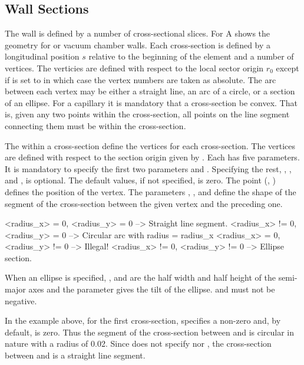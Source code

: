 \subsection{Wall Sections}
\label{s:wall.section}

The wall is defined by a number of cross-sectional slices. For A shows the
geometry for  or vacuum chamber walls.  Each cross-section is defined by a
longitudinal position $s$ relative to the beginning of the element and a number of vertices. The
verticies are defined with respect to the local sector origin $r_0$ except if 
is set to  in which case the vertex numbers are taken as absolute. The arc between each
vertex may be either a straight line, an arc of a circle, or a section of an ellipse. For a
capillary it is mandatory that a cross-section be convex. That is, given any two points within the
cross-section, all points on the line segment connecting them must be within the cross-section.

The  within a cross-section define the vertices for each cross-section. The vertices are
defined with respect to the section origin given by . Each  has five
parameters. It is mandatory to specify the first two parameters  and . Specifying
the rest, , , and , is optional. The default values, if not
specified, is zero. The point (, ) defines the position of the vertex. The
parameters , , and  define the shape of the segment of the
cross-section between the given vertex and the preceding one.
\begin{example}
  <radius_x>  = 0, <radius_y>  = 0   --> Straight line segment.
  <radius_x> != 0, <radius_y>  = 0   --> Circular arc with radius = radius_x
  <radius_x>  = 0, <radius_y> != 0   --> Illegal!
  <radius_x> != 0, <radius_y> != 0   --> Ellipse section.
\end{example}
When an ellipse is specified, , and  are
the half width and half height of the semi-major axes and the
 parameter gives the tilt of the ellipse. 
and  must not be negative.

In the example above, for the first cross-section,  specifies a non-zero 
and, by default,  is zero. Thus the segment of the cross-section between 
and  is circular in nature with a radius of 0.02. Since  does not specify
 nor , the cross-section between  and  is a straight
line segment.

